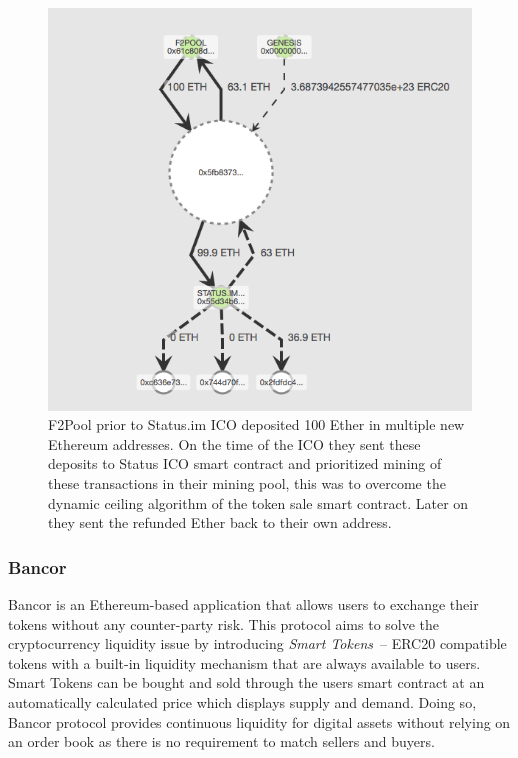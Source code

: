 

\begin{figure}[h]
\centering
\includegraphics[width=0.5\linewidth]{figures/F2Pool_transactions_to_StatusICO_and_Refunds.png}
\caption{F2Pool prior to Status.im ICO deposited 100 Ether in multiple new Ethereum addresses. On the time of the ICO they sent these deposits to Status ICO smart contract and prioritized mining of these transactions in their mining pool, this was to overcome the dynamic ceiling algorithm of the token sale smart contract. Later on they sent the refunded Ether back to their own address.\label{fig:f2poolfrontrun}}
\end{figure}



\subsubsection{Bancor} %

Bancor is an Ethereum-based application that allows users to exchange their tokens without any counter-party risk. This protocol aims to solve the cryptocurrency liquidity issue by introducing \textit{Smart Tokens}~\cite{hertzog2017bancor}-- ERC20 compatible tokens with a built-in liquidity mechanism that are always available to users. Smart Tokens can be bought and sold through the users smart contract at an automatically calculated price which displays supply and demand. Doing so, Bancor protocol provides continuous liquidity for digital assets without relying on an order book as there is no requirement to match sellers and buyers.


